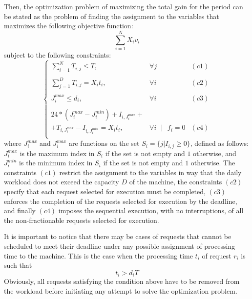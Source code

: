\documentclass{IEEEtran}
\begin{document}
Then, the optimization problem  of maximizing the total gain for the period can be stated as the problem of finding the assignment to the  variables that maximizes the following objective function:
\begin{equation}
\sum_{i=1}^{N} X_i v_i
\end{equation}
subject to the following constraints:
\[
\left\{ 
\begin{array}{lcc}
\sum_{i=1}^N T_{i,j} \leq T, & \forall  j& (c1)  \\
\\
\sum_{j=1}^D T_{i,j} = X_i t_i, & \forall i& (c2)  \\
\\
 J^{max}_i   \leq  d_i,  & \forall i & (c3) \\
 \\
 24*(J^{max}_i-J^{min}_i)+I_{i,J^{max}_i}+ & \\
 + T_{i,J^{max}_i} -I_{i,J^{min}_i} = X_i t_i, &  \forall i \mbox{ $|$ } f_i=0  & (c4) \\
 \end{array}
 \right.
 \]
where $J^{max}_i$ and $J^{max}_i$ are functions  on the set 
$S_i=\{j | I_{i,j} \geq 0\}$, 
defined as follows: $J^{max}_i$ is the maximum index in $S_i$ if the set is not empty and $1$ otherwise, and $J^{min}_i$ is the minimum index in $S_i$ if the set is not empty and $1$ otherwise. 
The constraints $(c1)$ restrict the assignment to the variables in way that the daily workload does not exceed the capacity $D$ of the machine, the constraints $(c2)$ specify that each request selected for execution must be completed, $(c3)$ enforces the completion of the requests selected for execution by the deadline, and finally $(c4)$ imposes the sequential execution, with no interruptions, of all the non-fractionable requests selected for execution. 

It is important to notice that there may be cases of requests that cannot be  scheduled to meet their deadline under any possible assignment of processing time to the machine. This is the case when the processing time $t_i$ of request $r_i$ is such that 
\begin{equation}
\label{unfeasible}
t_i > d_i T
\end{equation} 
Obviously, all requests satisfying the condition above have to be removed from the workload before initiating any attempt to solve the optimization problem. 
\end{document}
